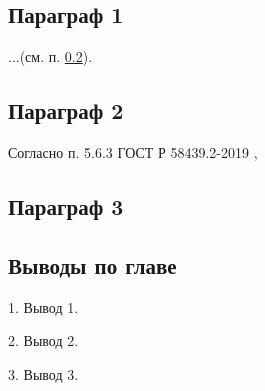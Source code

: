 \documentclass[../main.tex]{subfiles}
\begin{document}
	
\subsection{Параграф 1}

...(см. п. \ref{sec:format-treb}).

\subsection{Параграф 2} \label{sec:format-treb}







Согласно п. 5.6.3 ГОСТ Р 58439.2-2019 \cite{ГОСТ_58439-2}, 

\subsection{Параграф 3}





\subsection{Выводы по главе}

1. Вывод 1.

2. Вывод 2.

3. Вывод 3.
	
\end{document}
